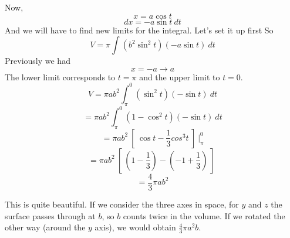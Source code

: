 \documentclass[11pt, oneside]{article}
\begin{document}
Now, 
\[ x = a \cos t \]
\[ dx = -a \sin t \ dt \]
And we will have to find new limits for the integral.  Let's set it up first
So
\[ V = \pi \int (b^2 \sin^2 t)(-a \sin t) \ dt\]
Previously we had 
\[ x = -a \rightarrow a \]
The lower limit corresponds to $t = \pi$ and the upper limit to $t=0$.
\[ V = \pi a b^2 \int_{\pi}^{0} (\sin^2 t) (- \sin t) \ dt\]
\[ = \pi a b^2 \int_{\pi}^{0} (1 - \cos^2 t) (- \sin t) \ dt\]
\[ = \pi a b^2 \ [ \ \cos t - \frac{1}{3} cos^3 t \ ] \ \bigg |_{\pi}^{0} \]
\[ = \pi a b^2 \ [ \ (1 - \frac{1}{3}) - (-1 + \frac{1}{3})   \ ] \  \]
\[ = \frac{4}{3} \pi a b^2  \]

This is quite beautiful.  If we consider the three axes in space, for $y$ and $z$ the surface passes through at $b$, so $b$ counts twice in the volume.  If we rotated the other way (around the $y$ axis), we would obtain $\frac{4}{3} \pi a^2 b$.
\end{document}
